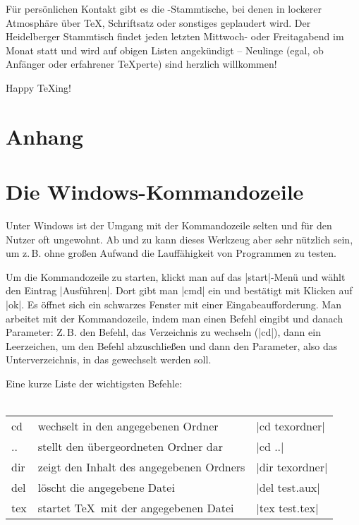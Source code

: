 \documentclass[12pt,ngerman]{scrartcl}
\begin{document}
Für persönlichen Kontakt gibt es die \DANTE-Stammtische, bei denen in lockerer Atmosphäre über \TeX, Schriftsatz oder sonstiges geplaudert wird. Der Heidelberger Stammtisch findet jeden letzten Mittwoch- oder Freitagabend im Monat statt und wird auf obigen Listen angekündigt – Neulinge (egal, ob Anfänger oder erfahrener \TeX perte) sind herzlich willkommen!
\vspace{1cm}

Happy \TeX{}ing!

\newpage
\begin{appendix}
\section*{Anhang}
\section{Die Windows-Kommandozeile}
Unter\label{cmd} Windows ist der Umgang mit der Kommandozeile selten und für den Nutzer oft ungewohnt. Ab und zu kann dieses Werkzeug aber sehr nützlich sein, um z.\,B. ohne großen Aufwand die Lauffähigkeit von Programmen zu testen.

Um die Kommandozeile zu starten, klickt man auf das |start|-Menü und wählt den Eintrag |Ausführen|. Dort gibt man |cmd| ein und bestätigt mit Klicken auf |ok|. Es öffnet sich ein schwarzes Fenster mit einer Eingabeaufforderung. Man arbeitet mit der Kommandozeile, indem man einen Befehl eingibt und danach Parameter: Z.\,B. den Befehl, das Verzeichnis zu wechseln (|cd|), dann ein Leerzeichen, um den Befehl abzuschließen und dann den Parameter, also das Unterverzeichnis, in das gewechselt werden soll.

Eine kurze Liste der wichtigsten Befehle:
\\ \\\hfill
\begin{minipage}{\textwidth}
\begin{tabular}{lll}
  cd & wechselt in den angegebenen Ordner & |cd texordner|\\
  .. & stellt den übergeordneten Ordner dar & |cd ..|\\
  dir & zeigt den Inhalt des angegebenen Ordners & |dir texordner|\\
  del & löscht die angegebene Datei & |del test.aux|\\
  tex & startet \TeX\ mit der angegebenen Datei & |tex test.tex|\\
\end{tabular}
\end{minipage}\hfill
\end{appendix}
\end{document}
